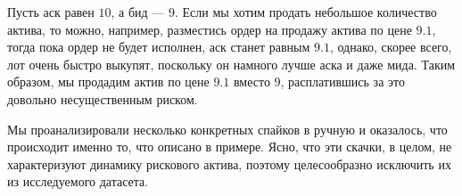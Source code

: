 \begin{example}
    Пусть аск равен $10$, а бид --- $9$. Если мы хотим продать небольшое количество актива, то можно, например, разместись ордер
    на продажу актива по цене $9.1$, тогда пока ордер не будет исполнен, аск станет равным $9.1$, однако, скорее всего, лот очень
    быстро выкупят, поскольку он намного лучше аска и даже мида. Таким образом, мы продадим актив по цене $9.1$ вместо $9$, 
    расплатившись за это довольно несущественным риском.
\end{example}

Мы проанализировали несколько конкретных спайков в ручную и оказалось, что происходит именно то, что описано в примере. 
Ясно, что эти скачки, в целом, не характеризуют
динамику рискового актива, поэтому целесообразно исключить их из исследуемого датасета. \par



